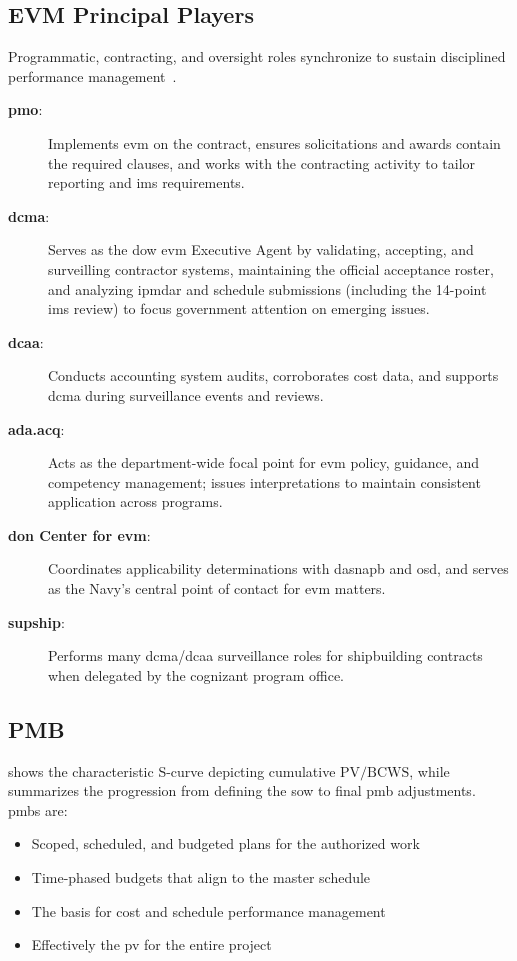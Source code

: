 \documentclass[../main.tex]{subfiles}
\begin{document}
\subsection{EVM Principal Players}
Programmatic, contracting, and oversight roles synchronize to sustain disciplined performance management~\autocite{edo-3-6-1-evm-intro-2025}.
\begin{description}
	\item[\textbf{\ac{pmo}}:] Implements \ac{evm} on the contract, ensures solicitations and awards contain the required clauses, and works with the contracting activity to tailor reporting and \ac{ims} requirements.
	\item[\textbf{\ac{dcma}}:] Serves as the \ac{dow} \ac{evm} Executive Agent by validating, accepting, and surveilling contractor systems, maintaining the official acceptance roster, and analyzing \ac{ipmdar} and schedule submissions (including the 14-point \ac{ims} review) to focus government attention on emerging issues.
	\item[\textbf{\ac{dcaa}}:] Conducts accounting system audits, corroborates cost data, and supports \ac{dcma} during surveillance events and reviews.
	\item[\textbf{\ac{ada.acq}}:] Acts as the department-wide focal point for \ac{evm} policy, guidance, and competency management; issues interpretations to maintain consistent application across programs.
	\item[\textbf{\ac{don} Center for \ac{evm}}:] Coordinates applicability determinations with \ac{dasnapb} and \ac{osd}, and serves as the Navy's central point of contact for \ac{evm} matters.
	\item[\textbf{\ac{supship}}:] Performs many \ac{dcma}/\ac{dcaa} surveillance roles for shipbuilding contracts when delegated by the cognizant program office.
\end{description}

\subsection{PMB}

\Fig{\ref{fig:pmb}} shows the characteristic S-curve depicting cumulative $\text{PV}/\text{BCWS}$, while \Fig{\ref{fig:pmb_dev}} summarizes the progression from defining the \ac{sow} to final \ac{pmb} adjustments. \ac{pmb}s are:
\begin{itemize}
	\item Scoped, scheduled, and budgeted plans for the authorized work
	\item Time-phased budgets that align to the master schedule
	\item The basis for cost and schedule performance management
	\item Effectively the \ac{pv} for the entire project
\end{itemize}
\end{document}

